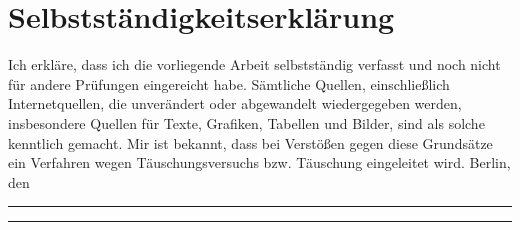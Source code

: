 



\tableofcontents*{}

\mainmatter








\printbibliography[heading=bibintoc]

\backmatter

\pagebreak

\chapter*{Selbstständigkeitserklärung}
Ich erkläre, dass ich die vorliegende Arbeit selbstständig verfasst und noch nicht für
andere Prüfungen eingereicht habe. Sämtliche Quellen, einschließlich Internetquellen, die unverändert oder
abgewandelt wiedergegeben werden, insbesondere Quellen für Texte, Grafiken, Tabellen und
Bilder, sind als solche kenntlich gemacht. Mir ist bekannt, dass bei Verstößen gegen diese
Grundsätze ein Verfahren wegen Täuschungsversuchs bzw. Täuschung eingeleitet wird.
\bigbreak
Berlin, den \parbox[t]{.2\linewidth}{\rule[-3pt]{\linewidth}{.4pt}} \hfill \parbox[t]{.3\linewidth}{\rule[-3pt]{\linewidth}{.4pt}}




